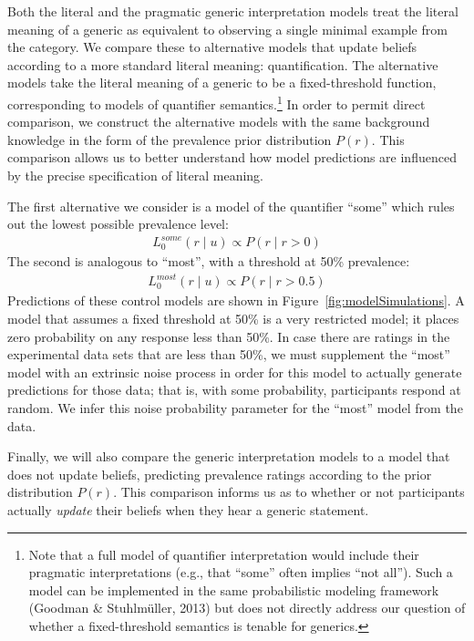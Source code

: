 \documentclass[floatsintext,doc]{apa6}
\let\rmarkdownfootnote\footnote%
\def\footnote{\protect\rmarkdownfootnote}
\begin{document}
Both the literal and the pragmatic generic interpretation models treat the literal meaning of a generic as equivalent to observing a single minimal example from the category.
We compare these to alternative models that update beliefs according to a more standard literal meaning: quantification.
The alternative models take the literal meaning of a generic to be a fixed-threshold function, corresponding to models of quantifier semantics.\footnote{Note that a full model of quantifier interpretation would include their pragmatic interpretations (e.g., that \enquote{some} often implies \enquote{not all}). Such a model can be implemented in the same probabilistic modeling framework (Goodman \& Stuhlmüller, 2013) but does not directly address our question of whether a fixed-threshold semantics is tenable for generics.} 
In order to permit direct comparison, we construct the alternative models with the same background knowledge in the form of the prevalence prior distribution \(P(r)\).
This comparison allows us to better understand how model predictions are influenced by the precise specification of literal meaning.

The first alternative we consider is a model of the quantifier \enquote{some} which rules out the lowest possible prevalence level:
\begin{eqnarray}
L_0^{some}(r \mid u) \propto  P(r \mid r > 0)  \label{eq:someModel}
\end{eqnarray}
The second is analogous to \enquote{most}, with a threshold at 50\% prevalence:
\begin{eqnarray}
L_0^{most}(r \mid u) \propto  P(r \mid r > 0.5)  \label{eq:mostModel}
\end{eqnarray}
Predictions of these control models are shown in Figure~\ref{fig:modelSimulations}.
A model that assumes a fixed threshold at 50\% is a very restricted model; it places zero probability on any response less than 50\%.
In case there are ratings in the experimental data sets that are less than 50\%, we must supplement the \enquote{most} model with an extrinsic noise process in order for this model to actually generate predictions for those data; that is, with some probability, participants respond at random.
We infer this noise probability parameter for the \enquote{most} model from the data.

Finally, we will also compare the generic interpretation models to a model that does not update beliefs, predicting prevalence ratings according to the prior distribution \(P(r)\).
This comparison informs us as to whether or not participants actually \emph{update} their beliefs when they hear a generic statement.
\end{document}
